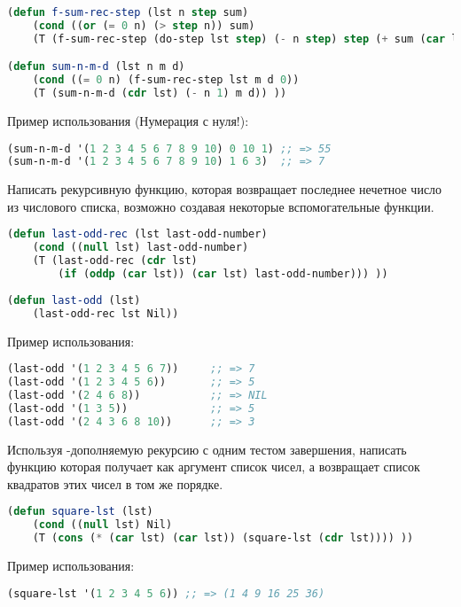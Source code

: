 \documentclass[a4paper,oneside,12pt]{extreport}
\begin{document}
\begin{task}
    \begin{lstlisting}[language=Lisp]
(defun f-sum-rec-step (lst n step sum)
    (cond ((or (= 0 n) (> step n)) sum)
    (T (f-sum-rec-step (do-step lst step) (- n step) step (+ sum (car lst)))) ))  

(defun sum-n-m-d (lst n m d)
    (cond ((= 0 n) (f-sum-rec-step lst m d 0))
    (T (sum-n-m-d (cdr lst) (- n 1) m d)) ))

    \end{lstlisting}

    Пример использования (Нумерация с нуля!):
    \begin{lstlisting}[language=Lisp] 
(sum-n-m-d '(1 2 3 4 5 6 7 8 9 10) 0 10 1) ;; => 55
(sum-n-m-d '(1 2 3 4 5 6 7 8 9 10) 1 6 3)  ;; => 7
    \end{lstlisting}
    
\end{task}

\begin{task}
	Написать рекурсивную функцию, которая возвращает последнее нечетное 
    число из числового списка, возможно создавая некоторые вспомогательные функции.

    \begin{lstlisting}[language=Lisp]
(defun last-odd-rec (lst last-odd-number)
    (cond ((null lst) last-odd-number)
    (T (last-odd-rec (cdr lst) 
        (if (oddp (car lst)) (car lst) last-odd-number))) ))
    
(defun last-odd (lst) 
    (last-odd-rec lst Nil))
    \end{lstlisting}

    Пример использования:
    \begin{lstlisting}[language=Lisp] 
(last-odd '(1 2 3 4 5 6 7))     ;; => 7
(last-odd '(1 2 3 4 5 6))       ;; => 5
(last-odd '(2 4 6 8))           ;; => NIL
(last-odd '(1 3 5))             ;; => 5
(last-odd '(2 4 3 6 8 10))      ;; => 3
    \end{lstlisting}
\end{task}

\begin{task}
	Используя -дополняемую рекурсию с одним тестом завершения, написать функцию
    которая получает как аргумент список чисел, а возвращает список квадратов этих чисел в том же порядке.

    \begin{lstlisting}[language=Lisp]
(defun square-lst (lst) 
    (cond ((null lst) Nil)
    (T (cons (* (car lst) (car lst)) (square-lst (cdr lst)))) ))     
    \end{lstlisting}

    Пример использования:
    \begin{lstlisting}[language=Lisp] 
(square-lst '(1 2 3 4 5 6)) ;; => (1 4 9 16 25 36)
    \end{lstlisting}
\end{task}
\end{document}
